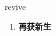 
\begin{frame}
{\huge revive}
\begin{center}
\begin{enumerate}\Large
  \item \textbf{再获新生}
\end{enumerate}
\end{center}
\end{frame}
